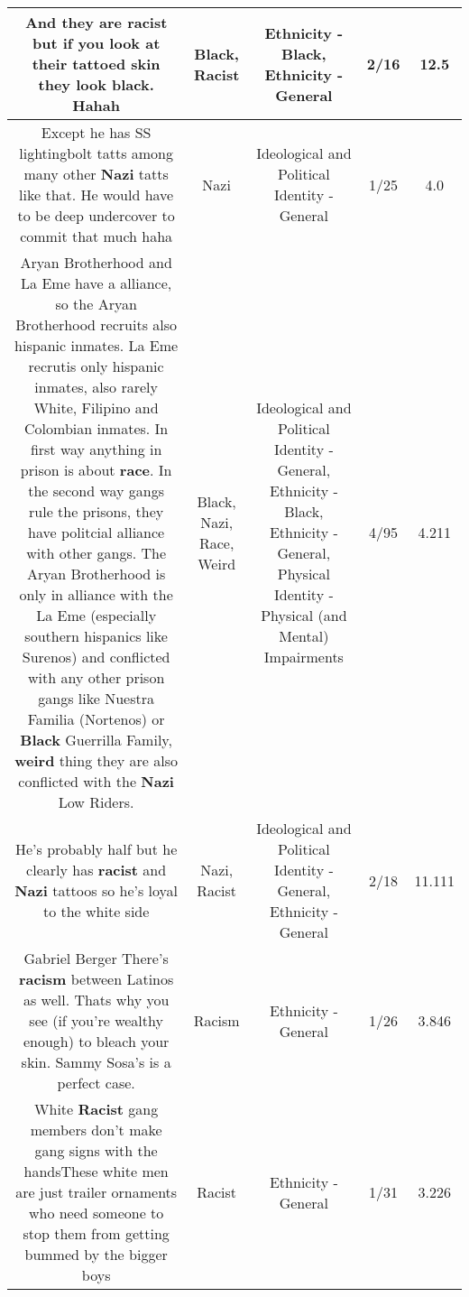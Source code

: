 \documentclass[11pt]{article}
\newlength\mylength
\begin{document}
\begin{center}
\begin{longtable}{|C{.65\mylength}|C{.30\mylength}|C{.12\mylength}|C{.12\mylength}|C{.12\mylength}|}
  \small And they are \textbf{racist} but if you look at their tattoed skin they look \textbf{black}. Hahah\normalsize   & Black, Racist & Ethnicity - Black, Ethnicity - General & 2/16 & 12.5 \\  \hline
  \small Except he has SS lightingbolt tatts among many other \textbf{Nazi} tatts like that. He would have to be deep undercover to commit that much haha\normalsize   & Nazi &  Ideological and Political Identity - General & 1/25 & 4.0 \\  \hline
  \small Aryan Brotherhood and La Eme have a alliance, so the Aryan Brotherhood recruits also hispanic inmates. La Eme recrutis only hispanic inmates, also rarely White, Filipino and Colombian inmates. In first way anything in prison is about \textbf{race}. In the second way gangs rule the prisons, they have politcial alliance with other gangs. The Aryan Brotherhood is only in alliance with the La Eme (especially southern hispanics like Surenos) and conflicted with any other prison gangs like Nuestra Familia (Nortenos) or \textbf{Black} Guerrilla Family, \textbf{weird} thing they are also conflicted with the \textbf{Nazi} Low Riders.\normalsize   & Black, Nazi, Race, Weird &  Ideological and Political Identity - General, Ethnicity - Black, Ethnicity - General, Physical Identity - Physical (and Mental) Impairments & 4/95 & 4.211 \\  \hline
  \small He's probably half but he clearly has \textbf{racist} and \textbf{Nazi} tattoos so he's loyal to the white side\normalsize   & Nazi, Racist &  Ideological and Political Identity - General, Ethnicity - General & 2/18 & 11.111 \\  \hline
  \small Gabriel Berger There's \textbf{racism} between Latinos as well. Thats why you see (if you're wealthy enough) to bleach your skin. Sammy Sosa's is a perfect case.\normalsize   & Racism & Ethnicity - General & 1/26 & 3.846 \\  \hline
  \small White \textbf{Racist} gang members don't make gang signs with the handsThese white men are just trailer ornaments who need someone to stop them from getting bummed by the bigger boys\normalsize   & Racist & Ethnicity - General & 1/31 & 3.226 \\  \hline

\end{longtable}
\end{center}
\end{document}
